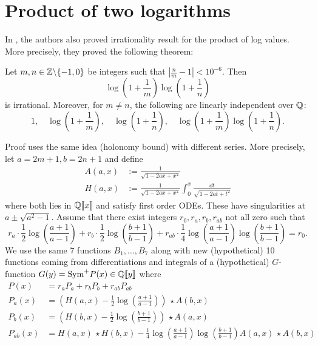 \section{Product of two logarithms}

In \cite{calegari2024linear}, the authors also proved irrationality result for the product of log values.
More precisely, they proved the following theorem:
\begin{theorem}
Let $m, n \in \mathbb{Z} \backslash \{-1, 0\}$ be integers such that $\left|\frac{n}{m} - 1\right| < 10^{-6}$.
Then
$$
    \log \left(1 + \frac{1}{m}\right) \log \left(1 + \frac{1}{n}\right)
$$
is irrational.
Moreover, for $m \ne n$, the following are linearly independent over $\mathbb{Q}$:
\begin{equation}
\label{eqn:log}
    1, \quad \log \left(1 + \frac{1}{m}\right), \quad \log \left(1 + \frac{1}{n} \right), \quad \log \left(1 + \frac{1}{m}\right) \log \left(1 + \frac{1}{n}\right).
\end{equation}
\end{theorem}
Proof uses the same idea (holonomy bound) with different series.
More precisely, let $a = 2m + 1, b = 2n+1$ and define
\begin{align*}
    A(a, x) &:= \frac{1}{\sqrt{1 - 2ax + x^2}} \\
    H(a, x) &:= \frac{1}{\sqrt{1 - 2ax + x^2}} \int_{0}^{x} \frac{\dd t}{\sqrt{1 - 2at + t^2}}
\end{align*}
where both lies in $\mathbb{Q} \llbracket x \rrbracket$ and satisfy first order ODEs.
These have singularities at $a \pm \sqrt{a^2 - 1}$.
Assume that there exist integers $r_0, r_a, r_b, r_{ab}$ not all zero such that
$$
    r_a \cdot \frac{1}{2} \log \left(\frac{a + 1}{a - 1}\right) + r_b \cdot \frac{1}{2} \log \left(\frac{b + 1}{b - 1}\right) + r_{ab} \cdot \frac{1}{4} \log \left(\frac{a + 1}{a - 1}\right) \log \left(\frac{b + 1}{b - 1}\right) = r_0.
$$
We use the same 7 functions $B_1, \dots, B_7$ along with new (hypothetical) 10 functions coming from differentiations and integrals of a (hypothetical) $G$-function $G(y) = \mathrm{Sym}^+ P(x) \in \mathbb{Q} \llbracket y \rrbracket$ where
\begin{align*}
    P(x) &= r_a P_a + r_b P_b + r_{ab} P_{ab} \\
    P_a(x) &= \left(H(a, x) - \frac{1}{2} \log \left(\frac{a+1}{a-1}\right) \right) \,\star A(b, x)  \\
    P_b(x) &= \left(H(b, x) - \frac{1}{2} \log \left(\frac{b+1}{b-1}\right)\right) \,\star A(a, x)  \\
    P_{ab}(x) &= H(a, x) \,\star H(b, x) - \frac{1}{4} \log \left(\frac{a+1}{a-1} \right) \log \left(\frac{b+1}{b-1}\right) A(a, x) \,\star A(b, x)
\end{align*}
